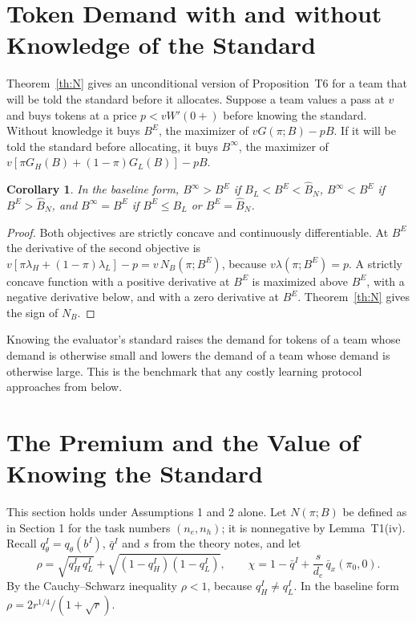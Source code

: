 \documentclass[11pt]{article}
\newtheorem{corollary}{Corollary}
\theoremstyle{definition}
\begin{document}
\section{Token Demand with and without Knowledge of the Standard}

Theorem~\ref{th:N} gives an unconditional version of Proposition~T6 for a team that will be told the standard before it allocates. Suppose a team values a pass at $v$ and buys tokens at a price $p<vW'(0+)$ before knowing the standard. Without knowledge it buys $B^E$, the maximizer of $vG(\pi;B)-pB$. If it will be told the standard before allocating, it buys $B^\infty$, the maximizer of $v[\pi G_H(B)+(1-\pi)G_L(B)]-pB$.

\begin{corollary}\label{cor:demand}
In the baseline form, $B^\infty>B^E$ if $B_L<B^E<\hat B_N$, $B^\infty<B^E$ if $B^E>\hat B_N$, and $B^\infty=B^E$ if $B^E\le B_L$ or $B^E=\hat B_N$.
\end{corollary}

\begin{proof}
Both objectives are strictly concave and continuously differentiable. At $B^E$ the derivative of the second objective is $v[\pi\lambda_H+(1-\pi)\lambda_L]-p=v\,N_B(\pi;B^E)$, because $v\lambda(\pi;B^E)=p$. A strictly concave function with a positive derivative at $B^E$ is maximized above $B^E$, with a negative derivative below, and with a zero derivative at $B^E$. Theorem~\ref{th:N} gives the sign of $N_B$.
\end{proof}

Knowing the evaluator's standard raises the demand for tokens of a team whose demand is otherwise small and lowers the demand of a team whose demand is otherwise large. This is the benchmark that any costly learning protocol approaches from below.

\section{The Premium and the Value of Knowing the Standard}

This section holds under Assumptions 1 and 2 alone. Let $N(\pi;B)$ be defined as in Section 1 for the task numbers $(n_e,n_h)$; it is nonnegative by Lemma~T1(iv). Recall $q_\theta^I=q_\theta(b^I)$, $\bar q^I$ and $s$ from the theory notes, and let
\[
\rho=\sqrt{q_H^I\,q_L^I}+\sqrt{(1-q_H^I)(1-q_L^I)},\qquad
\chi=1-\bar q^I+\frac{s}{d_e}\,\bar q_x(\pi_0,0).
\]
By the Cauchy--Schwarz inequality $\rho<1$, because $q_H^I\ne q_L^I$. In the baseline form $\rho=2r^{1/4}/(1+\sqrt r)$.
\end{document}
